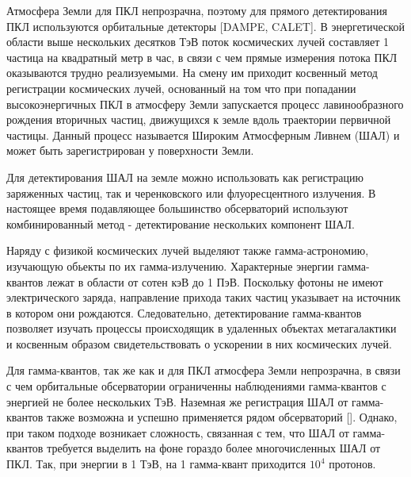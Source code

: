 Атмосфера Земли для ПКЛ непрозрачна, поэтому для прямого детектирования ПКЛ используются орбитальные детекторы [DAMPE, CALET]. В энергетической области выше нескольких десятков ТэВ поток космических лучей составляет 1 частица на квадратный метр в час, в связи с чем прямые измерения потока ПКЛ оказываются трудно реализуемыми. На смену им приходит косвенный метод регистрации космических лучей, основанный на том что при попадании высокоэнергичных ПКЛ в атмосферу Земли запускается процесс лавинообразного рождения вторичных частиц, движущихся к земле вдоль траектории первичной частицы. Данный процесс называется Широким Атмосферным Ливнем (ШАЛ) и может быть зарегистрирован у поверхности Земли. 


Для детектирования ШАЛ на земле можно использовать как регистрацию заряженных частиц, так и черенковского или флуоресцентного излучения. В настоящее время подавляющее большинство обсерваторий используют комбинированный метод - детектирование нескольких компонент ШАЛ.

Наряду с физикой космических лучей выделяют также гамма-астрономию, изучающую обьекты по их гамма-излучению. Характерные энергии гамма-квантов лежат в области от сотен кэВ до 1 ПэВ. Поскольку фотоны не имеют электрического заряда, направление прихода таких частиц указывает на источник в котором они рождаются. Следовательно, детектирование гамма-квантов позволяет изучать процессы происходящик в удаленных объектах метагалактики и косвенным образом свидетельствовать о ускорении в них космических лучей.

Для гамма-квантов, так же как и для ПКЛ атмосфера Земли непрозрачна, в связи с чем орбитальные обсерватории ограниченны наблюдениями гамма-квантов с энергией не более нескольких ТэВ. Наземная же регистрация ШАЛ от гамма-квантов также возможна и успешно применяется рядом обсерваторий []. Однако, при таком подходе возникает сложность, связанная с тем, что ШАЛ от гамма-квантов требуется выделить на фоне гораздо более многочисленных ШАЛ от ПКЛ. Так, при энергии в 1 ТэВ, на 1 гамма-квант приходится $10^4$ протонов.

